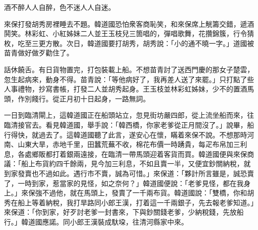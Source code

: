 \begin{myquote}
酒不醉人人自醉，色不迷人人自迷。
\end{myquote}

來保打發胡秀房裡睡去不題。韓道國恐怕衆客商恥笑，和來保席上觥籌交錯，遞酒鬨笑。林彩虹、小紅姊妹二人並王玉枝兒三箇唱的，彈唱歌舞，花攢錦簇，行令猜枚，吃至三更方散。次日，韓道國要打胡秀，胡秀說：「小的通不曉一字。」{}道國被苗青做好做歹勸住了。

話休饒舌。有日貨物置完，打包裝載上船。不想苗青討了送西門慶的那女子楚雲，忽生起病來，動身不得。{}苗青說：「等他病好了，我再差人送了來罷。」只打點了些人事禮物，抄寫書帳，打發二人並胡秀起身。王玉枝並林彩虹姊妹，少不的置酒馬頭，作別餞行。從正月初十日起身，一路無詞。

一日到臨清閘上，這韓道國正在船頭站立，忽見街坊嚴四郎，從上流坐船而來，往臨清接官去。看見韓道國，舉手說：「韓西橋，你家老爹從正月間沒了。」說畢，船行得快，就過去了。這韓道國聽了此言，遂安心在懷，瞞着來保不說。不想那時河南、山東大旱，赤地千里，田蠶荒蕪不收，棉花布價一時踴貴，每疋布帛加三利息，各處鄉販都打着銀兩遠接，在臨清一帶馬頭迎着客貨而買。韓道國便與來保商議：「船上布貨約四千餘兩，見今加三利息，不如且賣一半，又便宜鈔關納稅，就到家發賣也不過如此。遇行市不賣，誠為可惜。」來保道：「夥計所言雖是，誠恐賣了，一時到家，惹當家的見怪，如之奈何？」韓道國便說：「老爹見怪，都在我身上。」來保強不過他，就在馬頭上，發賣了一千兩布貨。韓道國說：「雙橋，你和胡秀在船上等着納稅，我打旱路同小郎王漢，打着這一千兩銀子，先去報老爹知道。」來保道：「你到家，好歹討老爹一封書來，下與鈔關錢老爹，少納稅錢，先放船行。」韓道國應諾。同小郎王漢裝成馱垜，往清河縣家中來。

